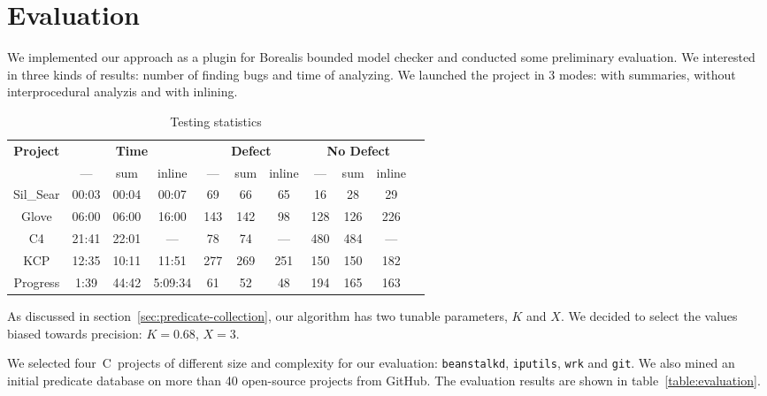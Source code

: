 \section{Evaluation}\label{sec:evaluation}

We implemented our approach as a plugin for Borealis bounded model checker and conducted some preliminary evaluation. We interested in three kinds of results: number of finding bugs and time of analyzing. We launched the project in 3 modes: with summaries, without interprocedural analyzis and with inlining.

\begin{table}[h]
\caption{\label{tab:test} Testing statistics}
\begin{tabular}{| c | c | c | c | c | c | c | c | c | c | c |}
\hline
\multirow{2}{*}{\bf Project} & \multicolumn{3}{|c|}{ \bf Time} & \multicolumn{3}{|c|}{\bf Defect} & \multicolumn{3}{|c|}{\bf No Defect}\\
\cline{2-10}
 & --- & sum &  inline & --- & sum &  inline & --- & sum &  inline \\
\hline
Sil_Sear  & 00:03 & \textcolor[rgb]{0,0.4,0}{00:04} &  00:07 & 69 &  \textcolor[rgb]{0,0.4,0}{66} &  65  & 16 &  28 &  29\\
\hline
Glove  & 06:00 & 06:00 &  16:00 & 143 & 142 & 98 & 128 & 126 & 226  \\
\hline
C4 &   21:41 & \textcolor[rgb]{0,0.4,0}{22:01} & --- & 78 & \textcolor[rgb]{0,0.4,0}{74} & --- & 480 & 484 & ---  \\
\hline
KCP  & 12:35 & 10:11 &  11:51  & 277 & 269 & 251 & 150 & 150 & 182 \\
\hline
Progress & 1:39 & \textcolor[rgb]{0,0.4,0}{44:42} & 5:09:34 & 61 & \textcolor[rgb]{0,0.4,0}{52} & 48 & 194 & 165 & 163 \\
\hline
\end{tabular}
\end{table}


As discussed in section~\ref{sec:predicate-collection}, our algorithm has two tunable parameters, $K$ and $X$. We decided to select the values biased towards precision: $K = 0.68$, $X = 3$.

We selected four~C~projects of different size and complexity for our evaluation: \texttt{beanstalkd}, \texttt{iputils}, \texttt{wrk} and \texttt{git}. We also mined an initial predicate database on more than 40 open-source projects from GitHub. The evaluation results are shown in table~\ref{table:evaluation}.

